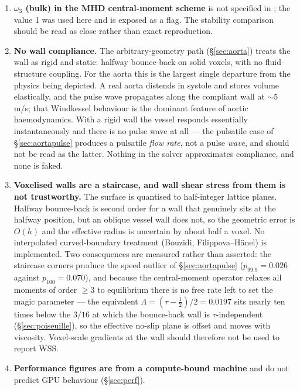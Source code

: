 \documentclass[11pt,a4paper]{article}
\newcommand{\e}[1]{\times 10^{#1}}
\begin{document}
\begin{enumerate}[leftmargin=1.4em,itemsep=4pt]
  Note that the force corrections of \S\ref{sec:regularized} \emph{raise} the
  reported Poiseuille error at $\tau=0.8$, from $9.07\e{-3}$ to $1.71\e{-2}$,
  because the force defect and the curvature slip have opposite signs there and
  were partially cancelling. That cancellation was accidental and
  $\tau$-specific; at $\tau=1$ the corrected condition is exact.

\item \textbf{$\omega_3$ (bulk) in the MHD central-moment scheme} is not specified
  in \cite{derosis2018}; the value 1 was used here and is exposed as a flag. The
  stability comparison should be read as close rather than exact reproduction.

\item \textbf{No wall compliance.} The arbitrary-geometry path
  (\S\ref{sec:aorta}) treats the wall as rigid and static: halfway bounce-back on
  solid voxels, with no fluid--structure coupling. For the aorta this is the
  largest single departure from the physics being depicted. A real aorta
  distends in systole and stores volume elastically, and the pulse wave
  propagates along the compliant wall at ${\sim}5$\,m/s; that Windkessel
  behaviour is the dominant feature of aortic haemodynamics. With a rigid wall
  the vessel responds essentially instantaneously and there is no pulse wave at
  all --- the pulsatile case of \S\ref{sec:aortapulse} produces a pulsatile
  \emph{flow rate}, not a pulse \emph{wave}, and should not be read as the
  latter. Nothing in the solver approximates compliance, and none is faked.

\item \textbf{Voxelised walls are a staircase, and wall shear stress from them
  is not trustworthy.} The surface is quantised to half-integer lattice planes.
  Halfway bounce-back is second order for a wall that genuinely sits at the
  halfway position, but an oblique vessel wall does not, so the geometric error
  is $O(h)$ and the effective radius is uncertain by about half a voxel. No
  interpolated curved-boundary treatment (Bouzidi, Filippova--H\"anel) is
  implemented. Two consequences are measured rather than asserted: the staircase
  corners produce the speed outlier of \S\ref{sec:aortapulse}
  ($p_{99.9}=0.026$ against $p_{100}=0.070$), and because the central-moment
  operator relaxes all moments of order $\ge 3$ to equilibrium there is no free
  rate left to set the magic parameter --- the equivalent
  $\Lambda = (\tau-\tfrac12)/2 = 0.0197$ sits nearly ten times below the $3/16$
  at which the bounce-back wall is $\tau$-independent
  (\S\ref{sec:poiseuille}), so the effective no-slip plane is offset and moves
  with viscosity. Voxel-scale gradients at the wall should therefore not be used
  to report WSS.

\item \textbf{Performance figures are from a compute-bound machine} and do not
  predict GPU behaviour (\S\ref{sec:perf}).
\end{enumerate}
\end{document}

